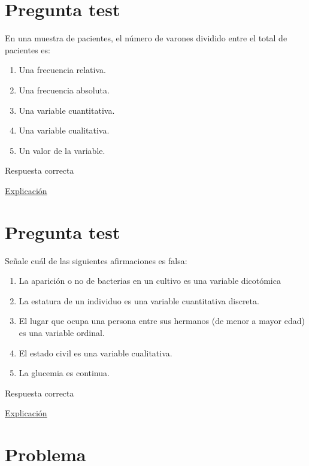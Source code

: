 \documentclass[
]{book}
\providecommand{\tightlist}{%
  \setlength{\itemsep}{0pt}\setlength{\parskip}{0pt}}
\begin{document}
\hypertarget{pregunta-test-4}{%
\section{Pregunta test}\label{pregunta-test-4}}

En una muestra de pacientes, el número de varones dividido entre el total de pacientes es:

\begin{enumerate}
\def\labelenumi{\alph{enumi})}
\tightlist
\item
  Una frecuencia relativa.
\item
  Una frecuencia absoluta.
\item
  Una variable cuantitativa.
\item
  Una variable cualitativa.
\item
  Un valor de la variable.
\end{enumerate}

Respuesta correcta

\href{https://1fjmanzano.github.io/bioestadistica/tablas-de-frecuencias.html}{Explicación}

\hypertarget{pregunta-test-5}{%
\section{Pregunta test}\label{pregunta-test-5}}

Señale cuál de las siguientes afirmaciones es falsa:

\begin{enumerate}
\def\labelenumi{\alph{enumi})}
\tightlist
\item
  La aparición o no de bacterias en un cultivo es una variable dicotómica
\item
  La estatura de un individuo es una variable cuantitativa discreta.
\item
  El lugar que ocupa una persona entre sus hermanos (de menor a mayor edad) es una variable ordinal.
\item
  El estado civil es una variable cualitativa.
\item
  La glucemia es continua.
\end{enumerate}

Respuesta correcta

\href{https://1fjmanzano.github.io/bioestadistica/tipos-de-variables.html}{Explicación}

\hypertarget{problema}{%
\section{Problema}\label{problema}}
\end{document}

